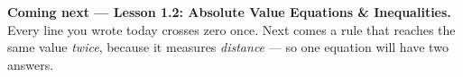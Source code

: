 \documentclass[12pt]{article}
\begin{document}
\boxguard[5]
\begin{spiralbox}
\textbf{Coming next --- Lesson 1.2: Absolute Value Equations \& Inequalities.} Every line you wrote
today crosses zero once. Next comes a rule that reaches the same value \emph{twice}, because it
measures \emph{distance} --- so one equation will have two answers.
\end{spiralbox}
\end{document}
